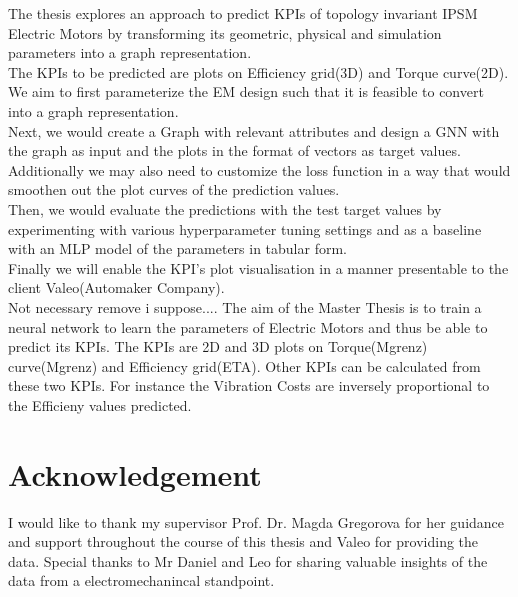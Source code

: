 \documentclass{report} %
\begin{document}
The thesis explores an approach to predict KPIs of topology invariant IPSM Electric Motors by transforming its geometric, physical and simulation parameters into a graph representation. \\
The KPIs to be predicted are plots on Efficiency grid(3D) and Torque curve(2D).\\
We aim to first parameterize the EM design such that it is feasible to convert into a graph representation. \\
Next, we would create a Graph with relevant attributes and design a GNN with the graph as input and the plots in the format of vectors as target values.\\
Additionally we may also need to customize the loss function in a way that would smoothen out the plot curves of the prediction values.\\
Then, we would evaluate the predictions with the test target values by experimenting with various hyperparameter tuning settings and as a baseline with an MLP model of the parameters in tabular form.\\
Finally we will enable the KPI's plot visualisation in a manner presentable to the client Valeo(Automaker Company).\\
Not necessary remove i suppose....
The aim of the Master Thesis is to train a neural network to learn the parameters of Electric Motors and thus be able to predict its KPIs.
The KPIs are 2D and 3D plots on Torque(Mgrenz) curve(Mgrenz) and Efficiency grid(ETA). Other KPIs can be calculated from these two KPIs.
For instance the Vibration Costs are inversely proportional to the Efficieny values predicted. 


\newpage 

\newpage 

\chapter*{Acknowledgement}
I would like to thank my supervisor Prof. Dr. Magda Gregorova for her guidance and support throughout the course of this thesis and Valeo for providing the data.
Special thanks to Mr Daniel and Leo for sharing valuable insights of the data from a electromechanincal standpoint.

\newpage

\newpage

\begin{spacing}{1.2}
    \tableofcontents
\end{spacing}
\end{document}
